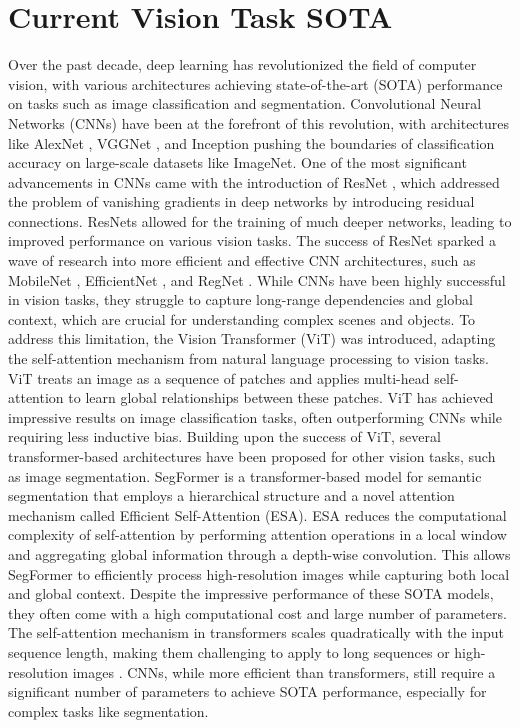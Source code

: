 \documentclass[conference]{IEEEtran}
\begin{document}
\section{Current Vision Task SOTA}
Over the past decade, deep learning has revolutionized the field of computer vision, with various architectures achieving state-of-the-art (SOTA) performance on tasks such as image classification and segmentation. Convolutional Neural Networks (CNNs) have been at the forefront of this revolution, with architectures like AlexNet \cite{krizhevsky2012imagenet}, VGGNet \cite{simonyan2014very}, and Inception \cite{szegedy2015going} pushing the boundaries of classification accuracy on large-scale datasets like ImageNet.
One of the most significant advancements in CNNs came with the introduction of ResNet \cite{he2016deep}, which addressed the problem of vanishing gradients in deep networks by introducing residual connections. ResNets allowed for the training of much deeper networks, leading to improved performance on various vision tasks. The success of ResNet sparked a wave of research into more efficient and effective CNN architectures, such as MobileNet \cite{howard2017mobilenets}, EfficientNet \cite{tan2019efficientnet}, and RegNet \cite{radosavovic2020designing}.
While CNNs have been highly successful in vision tasks, they struggle to capture long-range dependencies and global context, which are crucial for understanding complex scenes and objects. To address this limitation, the Vision Transformer (ViT) \cite{dosovitskiy2021image} was introduced, adapting the self-attention mechanism from natural language processing to vision tasks. ViT treats an image as a sequence of patches and applies multi-head self-attention to learn global relationships between these patches. ViT has achieved impressive results on image classification tasks, often outperforming CNNs while requiring less inductive bias.
Building upon the success of ViT, several transformer-based architectures have been proposed for other vision tasks, such as image segmentation. SegFormer \cite{xie2021segformer} is a transformer-based model for semantic segmentation that employs a hierarchical structure and a novel attention mechanism called Efficient Self-Attention (ESA). ESA reduces the computational complexity of self-attention by performing attention operations in a local window and aggregating global information through a depth-wise convolution. This allows SegFormer to efficiently process high-resolution images while capturing both local and global context.
Despite the impressive performance of these SOTA models, they often come with a high computational cost and large number of parameters. The self-attention mechanism in transformers scales quadratically with the input sequence length, making them challenging to apply to long sequences or high-resolution images \cite{choromanski2020rethinking}. CNNs, while more efficient than transformers, still require a significant number of parameters to achieve SOTA performance, especially for complex tasks like segmentation.
\end{document}

